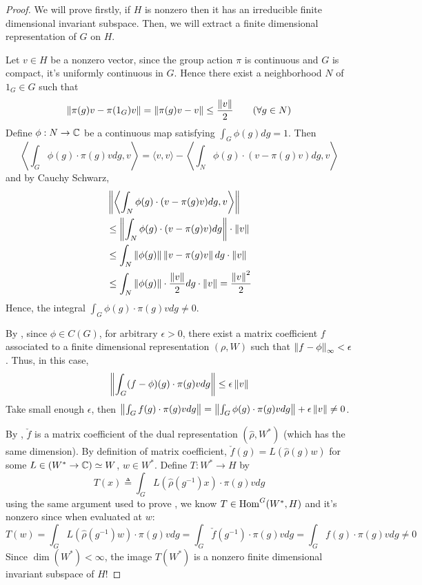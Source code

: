 \begin{proof}
  We will prove firstly, if $H$ is nonzero then it has an irreducible finite
  dimensional invariant subspace. Then, we will extract a finite dimensional
  representation of $G$ on $H$.

  Let $v \in H$ be a nonzero vector, since the group action $\pi$ is continuous
  and $G$ is compact, it's uniformly continuous in $G$. Hence there exist a
  neighborhood $N$ of $1_G \in G$ such that
  \[
    \left\lVert\pi(g)v - \pi(1_G)v\right\rVert = \left\lVert\pi(g)v - v\right\rVert \leq \frac{\left\lVert v\right\rVert}{2} \qquad (\forall g \in N)
  \]
  Define $\phi : N \to \operatorname{\mathbb{C}}$ be a continuous map satisfying $\int_G \phi(g) dg =
  1$. Then
  \[
    \left\langle \int_G \phi(g) \cdot \pi(g)v dg , v \right\rangle
    = \langle v, v \rangle - \left\langle \int_N \phi(g) \cdot (v - \pi(g)v) dg, v \right\rangle
  \]
  and by Cauchy Schwarz,
  \begin{align*}
    & \left\lVert \left\langle \int_N \phi(g) \cdot (v - \pi(g)v) dg, v  \right\rangle \right\rVert\\
    & \leq \left\lVert\int_N \phi(g) \cdot (v - \pi(g)v) dg\right\rVert \cdot \left\lVert v\right\rVert\\
    & \leq \int_N \left\lVert\phi(g)\right\rVert \left\lVert v - \pi(g)v\right\rVert dg \cdot \left\lVert v\right\rVert\\
    & \leq \int_N \left\lVert\phi(g)\right\rVert \cdot \frac{\left\lVert v\right\rVert}{2} dg \cdot \left\lVert v\right\rVert
      = \frac{\left\lVert v\right\rVert^2}{2}
  \end{align*}
  Hence, the integral $\int_G \phi(g) \cdot \pi(g)v dg \neq 0$.

  By , since $\phi \in C(G)$, for arbitrary $\epsilon > 0$,
  there exist a matrix coefficient $f$ associated to a finite dimensional
  representation $(\rho, W)$ such that $\left\lVert f - \phi\right\rVert_{\infty} < \epsilon$. Thus, in
  this case,
  \[
    \left\lVert\int_G (f - \phi)(g) \cdot \pi(g)v dg\right\rVert \leq \epsilon \left\lVert v\right\rVert
  \]
  Take small enough $\epsilon$, then $\left\lVert\int_G f(g) \cdot \pi(g)v dg\right\rVert =
  \left\lVert\int_G \phi(g) \cdot \pi(g)v dg\right\rVert + \epsilon \left\lVert v\right\rVert \neq 0$.

  By , $\check{f}$ is a matrix coefficient of the dual
  representation $(\hat{\rho}, W^*)$ (which has the same dimension). By
  definition of matrix coefficient, $\check{f}(g) = L(\hat{\rho}(g)w)$ for some $L \in
  (W^* \to \operatorname{\mathbb{C}}) \simeq W$, $w \in W^*$. Define $T : W^* \to H$ by
  \[
    T(x) \triangleq \int_G L(\hat{\rho}(g^{-1})x) \cdot \pi(g)v dg
  \]
  using the same argument used to prove , we know $T
  \in \operatorname{Hom}^G(W^*, H)$ and it's nonzero since when evaluated at $w$:
  \[
    T(w) = \int_G L(\hat{\rho}(g^{-1})w) \cdot \pi(g)v dg
    = \int_G \check{f}(g^{-1}) \cdot \pi(g)v dg
    = \int_G f(g) \cdot \pi(g)v dg \neq 0
  \]
  Since $\dim(W^*) < \infty$, the image $T(W^*)$ is a nonzero finite dimensional
  invariant subspace of $H$!


\end{proof}
